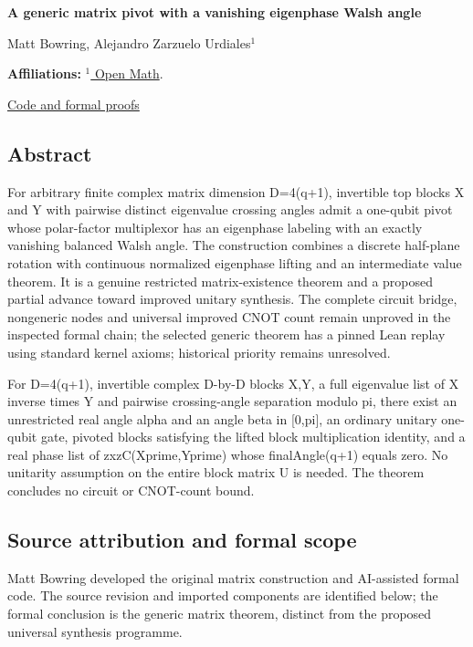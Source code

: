 \documentclass[11pt,a4paper]{article}
\begin{document}
{\LARGE\bfseries A generic matrix pivot with a vanishing eigenphase Walsh angle\par}\medskip
{\small Matt Bowring, Alejandro Zarzuelo Urdiales\ensuremath{^1}\par}\medskip
{\small\textbf{Affiliations:} \href{https://rsihouse.ai/openmath}{\ensuremath{^1} Open Math}.\par}

{\small\href{https://github.com/alejandrozu/openmath-2026-judging}{Code and formal proofs}\par}

\subsection{Abstract}
For arbitrary finite complex matrix dimension D=4(q+1), invertible top blocks X and Y with pairwise distinct eigenvalue crossing angles admit a one-qubit pivot whose polar-factor multiplexor has an eigenphase labeling with an exactly vanishing balanced Walsh angle. The construction combines a discrete half-plane rotation with continuous normalized eigenphase lifting and an intermediate value theorem. It is a genuine restricted matrix-existence theorem and a proposed partial advance toward improved unitary synthesis. The complete circuit bridge, nongeneric nodes and universal improved CNOT count remain unproved in the inspected formal chain; the selected generic theorem has a pinned Lean replay using standard kernel axioms; historical priority remains unresolved.

For D=4(q+1), invertible complex D-by-D blocks X,Y, a full eigenvalue list of X inverse times Y and pairwise crossing-angle separation modulo pi, there exist an unrestricted real angle alpha and an angle beta in [0,pi], an ordinary unitary one-qubit gate, pivoted blocks satisfying the lifted block multiplication identity, and a real phase list of zxzC(Xprime,Yprime) whose finalAngle(q+1) equals zero. No unitarity assumption on the entire block matrix U is needed. The theorem concludes no circuit or CNOT-count bound.

\subsection{Source attribution and formal scope}
Matt Bowring developed the original matrix construction and AI-assisted formal code. The source revision and imported components are identified below; the formal conclusion is the generic matrix theorem, distinct from the proposed universal synthesis programme.
\end{document}
